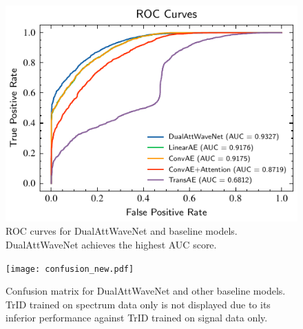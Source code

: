 \documentclass[conference]{IEEEtran}
\begin{document}
\begin{figure}[t]
    \centering
    \includegraphics[width=0.8\linewidth]{roc-comparison.pdf}
    \caption{ROC curves for DualAttWaveNet and baseline models. DualAttWaveNet achieves the highest AUC score.}
    \label{fig:roc_comparison}
\end{figure}

\begin{figure}[tb]
    \centering
    \texttt{[image: confusion\_new.pdf]}
    \caption{Confusion matrix for DualAttWaveNet and other baseline models. TrID trained on spectrum data only is not displayed due to its inferior performance against TrID trained on signal data only.}
    \label{fig:confusion_matrix}
\end{figure}




\end{document}
